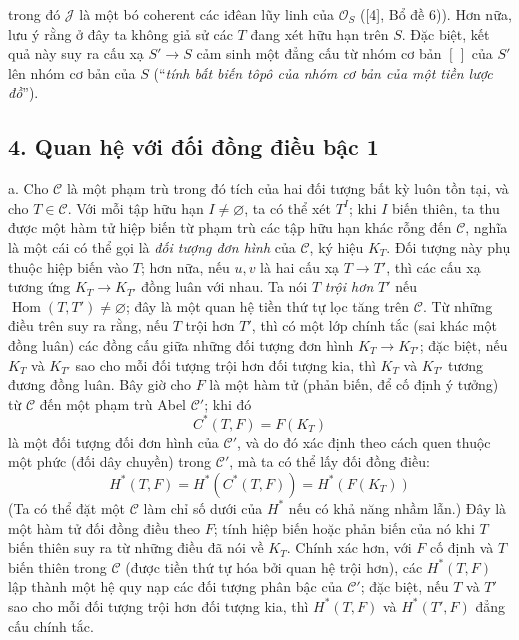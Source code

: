 \documentclass[11pt,twoside,openany]{book}
\numberwithin{equation}{section}
\newcommand{\src}[1]{%
  \phantomsection\hypertarget{src:\fgasourceid:#1}{}%
  \marginpar{\raggedleft\footnotesize\sffamily #1}%
}
\newcommand{\fgasourceid}{unset}
\begin{document}
\src{310}
trong đó $\mathcal J$ là một bó coherent các iđêan lũy linh của $\mathcal O_S$
([4], Bổ đề 6)). Hơn nữa, lưu ý rằng ở đây ta không giả sử các $T$ đang xét hữu
hạn trên $S$. Đặc biệt, kết quả này suy ra cấu xạ $S'\longrightarrow S$ cảm
sinh một đẳng cấu từ nhóm cơ bản $[\,]$ của $S'$ lên nhóm cơ bản của $S$
(``\emph{tính bất biến tôpô của nhóm cơ bản của một tiền lược đồ}'').

\subsection*{4. Quan hệ với đối đồng điều bậc 1}

\medskip\noindent
a. Cho $\mathcal C$ là một phạm trù trong đó tích của hai đối tượng bất kỳ luôn
tồn tại, và cho $T\in\mathcal C$. Với mỗi tập hữu hạn
$I\ne\varnothing$, ta có thể xét $T^I$; khi $I$ biến thiên, ta thu được một hàm
tử hiệp biến từ phạm trù các tập hữu hạn khác rỗng đến $\mathcal C$, nghĩa là
một cái có thể gọi là \emph{đối tượng đơn hình} của $\mathcal C$, ký hiệu
$K_T$. Đối tượng này phụ thuộc hiệp biến vào $T$; hơn nữa, nếu $u,v$ là hai
cấu xạ $T\longrightarrow T'$, thì các cấu xạ tương ứng
$K_T\longrightarrow K_{T'}$ đồng luân với nhau. Ta nói $T$
\emph{trội hơn} $T'$ nếu $\operatorname{Hom}(T,T')\ne\varnothing$; đây là một
quan hệ tiền thứ tự lọc tăng trên $\mathcal C$. Từ những điều trên suy ra rằng,
nếu $T$ trội hơn $T'$, thì có một lớp chính tắc (sai khác một đồng luân) các
đồng cấu giữa những đối tượng đơn hình $K_T\longrightarrow K_{T'}$; đặc biệt,
nếu $K_T$ và $K_{T'}$ sao cho mỗi đối tượng trội hơn đối tượng kia, thì $K_T$
và $K_{T'}$ tương đương đồng luân. Bây giờ cho $F$ là một hàm tử (phản biến,
để cố định ý tưởng) từ $\mathcal C$ đến một phạm trù Abel $\mathcal C'$; khi đó
\[
  C^*(T,F)=F(K_T)
\]
là một đối tượng đối đơn hình của $\mathcal C'$, và do đó xác định theo cách
quen thuộc một phức (đối dây chuyền) trong $\mathcal C'$, mà ta có thể lấy đối
đồng điều:
\[
  H^*(T,F)=H^*(C^*(T,F))=H^*(F(K_T))
\]
(Ta có thể đặt một $\mathcal C$ làm chỉ số dưới của $H^*$ nếu có khả năng nhầm
lẫn.) Đây là một hàm tử đối đồng điều theo $F$; tính hiệp biến hoặc phản biến
của nó khi $T$ biến thiên suy ra từ những điều đã nói về $K_T$. Chính xác hơn,
với $F$ cố định và $T$ biến thiên trong $\mathcal C$ (được tiền thứ tự hóa bởi
quan hệ trội hơn), các $H^*(T,F)$ lập thành một hệ quy nạp các đối tượng phân
bậc của $\mathcal C'$; đặc biệt, nếu $T$ và $T'$ sao cho mỗi đối tượng trội hơn
đối tượng kia, thì $H^*(T,F)$ và $H^*(T',F)$ đẳng cấu chính tắc.
\end{document}
